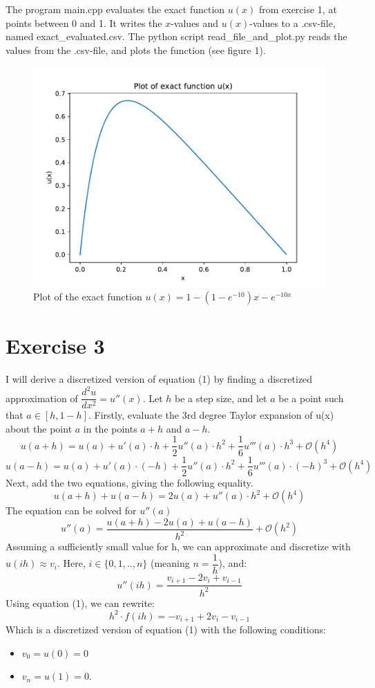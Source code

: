 \documentclass[11pt]{article} %
\begin{document}
The program main.cpp evaluates the exact function \(u(x)\) from exercise 1, at points between 0 and 1. 
It writes the \(x\)-values and \(u(x)\)-values to a .csv-file, named exact\_evaluated.csv.
The python script read\_file\_and\_plot.py reads the values from the .csv-file, and plots the function (see figure 1).
\begin{figure}[htbp]
\centerline{\includegraphics{exact_function_u(x).pdf}}
\caption{Plot of the exact function \(u(x) = 1 - (1- e^{-10})x -e^{-10x}\)}
\label{fig}
\end{figure}

\section*{Exercise 3}

I will derive a discretized version of equation (1) by finding a discretized approximation of \(\dfrac{d^2u}{dx^2}=u''(x)\).  
Let \(h\) be a step size, and let \(a\) be a point such that \(a \in [h, 1-h]\). Firstly, evaluate the 3rd degree Taylor expansion of u(x) about the point \(a\) in the points \(a+h\) and \(a-h\).
\[u(a+h) =u(a) + u'(a)\cdot h + \dfrac{1}{2}u''(a) \cdot h^2 + \dfrac{1}{6}u'''(a) \cdot h^3 + \mathcal{O}(h^4) \]
\[u(a-h) =u(a) + u'(a)\cdot (-h) + \dfrac{1}{2}u''(a) \cdot h^2 + \dfrac{1}{6}u'''(a) \cdot (-h)^3 + \mathcal{O}(h^4) \]
Next, add the two equations, giving the following equality.
\[ u(a+h) + u(a-h) = 2u(a) + u''(a)\cdot h^2 + \mathcal{O}(h^4) \]
The equation can be solved for \(u''(a)\)
\[u''(a) = \dfrac{u(a+h) - 2u(a) +u(a-h)}{h^2} + \mathcal{O}(h^2) \]
Assuming a sufficiently small value for h, we can approximate and discretize with \(u(ih) \approx v_i\). Here, \(i \in \{0, 1, .., n\}\) (meaning \(n=\dfrac{1}{h}\)), and:
\[u''(ih) = \dfrac{v_{i+1} - 2v_i +v_{i-1}}{h^2} \]
Using equation (1), we can rewrite:
\begin{equation}h^2 \cdot f(ih) = -v_{i+1} + 2v_i - v_{i-1}\end{equation}
Which is a discretized version of equation (1) with the following conditions:
\begin{itemize}
	\item \(v_0=u(0)=0\) 
	\item \(v_{n}=u(1)=0\).
\end{itemize}
\end{document}
